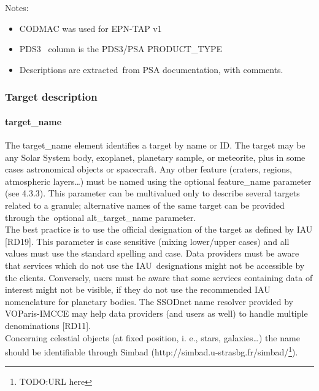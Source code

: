 \documentclass[11pt,a4paper]{ivoa}
\begin{document}
Notes:

\begin{itemize}
\item CODMAC was used for EPN-TAP v1
\item PDS3  column is the PDS3/PSA PRODUCT\_TYPE 
\item Descriptions are extracted from PSA documentation, with comments.
\end{itemize}

\subsubsection{Target description}

\paragraph{target\_name}

The target\_name element identifies a target by name or ID. The target may be any Solar System body, exoplanet, planetary sample, or meteorite, plus in some cases astronomical objects or spacecraft. Any other feature (craters, regions, atmospheric layers…) must be named using the optional feature\_name parameter (see 4.3.3). This parameter can be multivalued only to describe several targets related to a granule; alternative names of the same target can be provided through the optional alt\_target\_name parameter.\\ The best practice is to use the official designation of the target as defined by IAU [RD19]. This parameter is case sensitive (mixing lower/upper cases) and all values must use the standard spelling and case. Data providers must be aware that services which do not use the IAU designations might not be accessible by the clients. Conversely, users must be aware that some services containing data of interest might not be visible, if they do not use the recommended IAU nomenclature for planetary bodies. The SSODnet name resolver provided by VOParis-IMCCE may help data providers (and users as well) to handle multiple denominations [RD11].\\Concerning celestial objects (at fixed position, i. e., stars, galaxies…) the name should be identifiable through Simbad (http://simbad.u-strasbg.fr/simbad/\footnote{TODO:URL here}).
\end{document}
